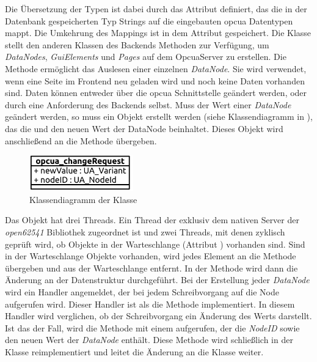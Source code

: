 Die Übersetzung der Typen ist dabei durch das Attribut  definiert, das die in der Datenbank gespeicherten Typ Strings auf die eingebauten \ac{opcua} Datentypen mappt.
Die Umkehrung des Mappings ist in dem Attribut \mbox{} gespeichert.
Die Klasse  stellt den anderen Klassen des Backends Methoden zur Verfügung, um \emph{DataNodes}, \emph{GuiElements} und \emph{Pages} auf dem OpcuaServer zu erstellen.
Die Methode  ermöglicht das Auslesen einer einzelnen \emph{DataNode}. 
Sie wird verwendet, wenn eine Seite im Frontend neu geladen wird und noch keine Daten vorhanden sind.
Daten können entweder über die \ac{opcua} Schnittstelle geändert werden, oder durch eine Anforderung des Backends selbst.
Muss der Wert einer \emph{DataNode} geändert werden, so muss ein  Objekt erstellt werden (siehe Klassendiagramm in ), 
das die  und den neuen Wert der DataNode beinhaltet. Dieses Objekt wird anschließend an die Methode  übergeben.
\begin{figure}[ht]
  \centering
  \includegraphics[width=0.4\textwidth]{content/hauptteil/umsetzungPoC/backend/uml/classesOfOverview/opcua_changeRequest.pdf}
  \caption{Klassendiagramm der Klasse }
  \label{fig:backend:classDiag:opcuaCR}
\end{figure}
Das  Objekt hat drei Threads. 
Ein Thread der exklusiv dem nativen Server der \emph{open62541} Bibliothek zugeordnet ist und zwei Threads, mit denen zyklisch geprüft wird, 
ob  Objekte in der Warteschlange (Attribut ) vorhanden sind.
Sind in der Warteschlange  Objekte vorhanden, wird jedes Element an die Methode  übergeben und aus der Warteschlange entfernt.
In der Methode  wird dann die Änderung an der Datenstruktur durchgeführt. %
Bei der Erstellung jeder \emph{DataNode} wird ein Handler angemeldet, der bei jedem Schreibvorgang auf die Node aufgerufen wird.
Dieser Handler ist als die Methode  implementiert.
In diesem Handler wird verglichen, ob der Schreibvorgang ein Änderung des Werts darstellt. 
Ist das der Fall, wird die Methode  mit einem  aufgerufen, der die \emph{NodeID} sowie den neuen Wert der \emph{DataNode} enthält.
Diese Methode wird schließlich in der  Klasse reimplementiert und leitet die Änderung an die  Klasse weiter. 